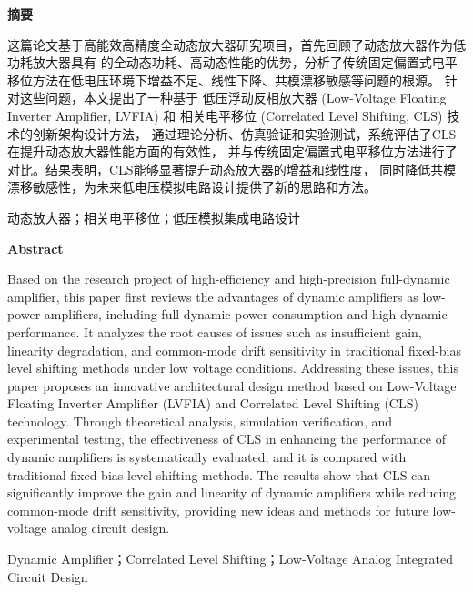 \setcounter{page}{7}
\begin{center}
    \vspace{0.5ex}
    \bfseries 摘要
    \vspace{0.5ex}
\end{center}



这篇论文基于高能效高精度全动态放大器研究项目，首先回顾了动态放大器作为低功耗放大器具有
的全动态功耗、高动态性能的优势，分析了传统固定偏置式电平移位方法在低电压环境下增益不足、线性下降、共模漂移敏感等问题的根源。
针对这些问题，本文提出了一种基于 低压浮动反相放大器 (Low-Voltage Floating Inverter Amplifier, LVFIA) 和 相关电平移位 (Correlated Level Shifting, CLS) 技术的创新架构设计方法，
通过理论分析、仿真验证和实验测试，系统评估了CLS在提升动态放大器性能方面的有效性，
并与传统固定偏置式电平移位方法进行了对比。结果表明，CLS能够显著提升动态放大器的增益和线性度，
同时降低共模漂移敏感性，为未来低电压模拟电路设计提供了新的思路和方法。

\par
{}动态放大器；相关电平移位；低压模拟集成电路设计

\newpage
\setcounter{page}{9}

\begin{center}
    \vspace{0.5ex}
    \bfseries Abstract
    \vspace{0.5ex}
\end{center}

Based on the research project of high-efficiency and high-precision full-dynamic amplifier, 
this paper first reviews the advantages of dynamic amplifiers as low-power amplifiers, 
including full-dynamic power consumption and high dynamic performance. 
It analyzes the root causes of issues such as insufficient gain, 
linearity degradation, and common-mode drift sensitivity in 
traditional fixed-bias level shifting methods under low voltage conditions.
Addressing these issues, this paper proposes an innovative architectural 
design method based on Low-Voltage Floating Inverter Amplifier (LVFIA) and 
Correlated Level Shifting (CLS) technology. Through theoretical analysis, 
simulation verification, and experimental testing, 
the effectiveness of CLS in enhancing the performance of dynamic 
amplifiers is systematically evaluated, 
and it is compared with traditional fixed-bias level shifting methods. 
The results show that CLS can significantly improve 
the gain and linearity of dynamic amplifiers while reducing common-mode drift sensitivity, 
providing new ideas and methods for future low-voltage analog circuit design.

Dynamic Amplifier；Correlated Level Shifting；Low-Voltage Analog Integrated Circuit Design
